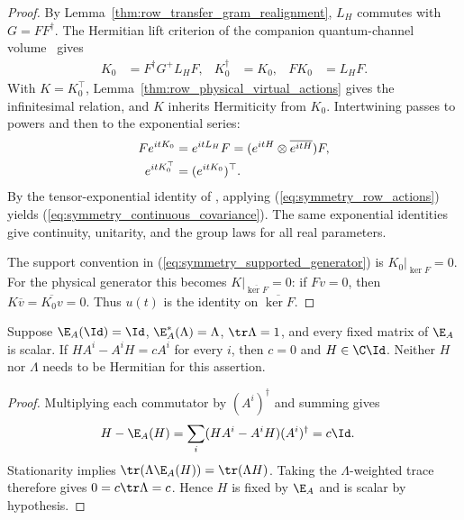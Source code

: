 \begin{proof}\leanok
    By Lemma~\ref{thm:row_transfer_gram_realignment}, $L_H$ commutes
    with $G=FF^\dagger$. The Hermitian lift criterion of the companion
    quantum-channel volume~\cite[``Hermitian intertwiners of rectangular
        matrices'']{QICLean2026Blueprint} gives
    \begin{align}
        K_0 & =F^\dagger G^+L_HF,
            & K_0^\dagger         & =K_0,
            & FK_0                & =L_HF.
        \label{eq:symmetry_supported_generator}
    \end{align}
    With $K=K_0^\top$, Lemma~\ref{thm:row_physical_virtual_actions}
    gives the infinitesimal relation, and $K$ inherits Hermiticity from $K_0$.
    Intertwining passes to powers and then to the exponential series:
    \begin{align}
        Fe^{itK_0}     & =e^{itL_H}F
        =(e^{itH}\otimes\overline{e^{itH}})F,\notag \\
        e^{itK_0^\top} & =(e^{itK_0})^\top.
        \notag
    \end{align}
    By the tensor-exponential identity of
    \cite[``Hermitian exponential paths'']{QICLean2026Blueprint},
    applying (\ref{eq:symmetry_row_actions}) yields
    (\ref{eq:symmetry_continuous_covariance}).
    The same exponential identities give continuity, unitarity, and the
    group laws for all real parameters.

    The support convention in (\ref{eq:symmetry_supported_generator}) is
    $K_0|_{\ker F}=0$. For the physical generator this becomes
    $K|_{\overline{\ker F}}=0$: if $Fv=0$, then
    $K\overline v=\overline{K_0v}=0$.
    Thus $u(t)$ is the identity on $\overline{\ker F}$.
\end{proof}

\begin{lemma}
    \label{thm:scalar_physical_commutator_rigidity}
    \leanok
    Suppose $\E_A(\Id)=\Id$, $\E_A^*(\Lambda)=\Lambda$,
    $\tr\Lambda=1$, and every fixed matrix of $\E_A$ is scalar.
    If $HA^i-A^iH=cA^i$ for every $i$, then $c=0$ and $H\in\C\Id$.
    Neither $H$ nor $\Lambda$ needs to be Hermitian for this assertion.
\end{lemma}
\begin{proof}\leanok
    Multiplying each commutator by $(A^i)^\dagger$ and summing gives
    \begin{align}
        H-\E_A(H)
         & =\sum_i(HA^i-A^iH)(A^i)^\dagger=c\Id.
        \notag
    \end{align}
    Stationarity implies $\tr(\Lambda\E_A(H))=\tr(\Lambda H)$.
    Taking the $\Lambda$-weighted trace therefore gives $0=c\tr\Lambda=c$.
    Hence $H$ is fixed by $\E_A$ and is scalar by hypothesis.
\end{proof}

